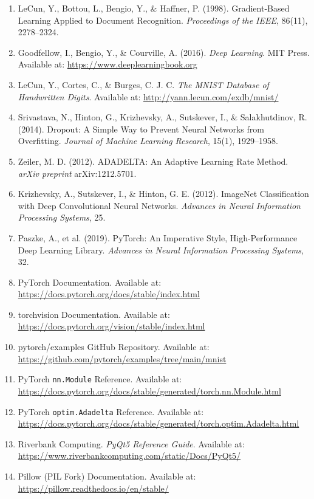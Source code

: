 \documentclass[12pt,a4paper,openany]{report}
\begin{document}
\begin{enumerate}
    \item LeCun, Y., Bottou, L., Bengio, Y., \& Haffner, P. (1998). Gradient-Based Learning Applied to Document Recognition. \textit{Proceedings of the IEEE}, 86(11), 2278--2324.
    \item Goodfellow, I., Bengio, Y., \& Courville, A. (2016). \textit{Deep Learning}. MIT Press. Available at: \url{https://www.deeplearningbook.org}
    \item LeCun, Y., Cortes, C., \& Burges, C. J. C. \textit{The MNIST Database of Handwritten Digits}. Available at: \url{http://yann.lecun.com/exdb/mnist/}
    \item Srivastava, N., Hinton, G., Krizhevsky, A., Sutskever, I., \& Salakhutdinov, R. (2014). Dropout: A Simple Way to Prevent Neural Networks from Overfitting. \textit{Journal of Machine Learning Research}, 15(1), 1929--1958.
    \item Zeiler, M. D. (2012). ADADELTA: An Adaptive Learning Rate Method. \textit{arXiv preprint} arXiv:1212.5701.
    \item Krizhevsky, A., Sutskever, I., \& Hinton, G. E. (2012). ImageNet Classification with Deep Convolutional Neural Networks. \textit{Advances in Neural Information Processing Systems}, 25.
    \item Paszke, A., et al. (2019). PyTorch: An Imperative Style, High-Performance Deep Learning Library. \textit{Advances in Neural Information Processing Systems}, 32.
    \item PyTorch Documentation. Available at: \url{https://docs.pytorch.org/docs/stable/index.html}
    \item torchvision Documentation. Available at: \url{https://docs.pytorch.org/vision/stable/index.html}
    \item pytorch/examples GitHub Repository. Available at: \url{https://github.com/pytorch/examples/tree/main/mnist}
    \item PyTorch \texttt{nn.Module} Reference. Available at: \url{https://docs.pytorch.org/docs/stable/generated/torch.nn.Module.html}
    \item PyTorch \texttt{optim.Adadelta} Reference. Available at: \url{https://docs.pytorch.org/docs/stable/generated/torch.optim.Adadelta.html}
    \item Riverbank Computing. \textit{PyQt5 Reference Guide}. Available at: \url{https://www.riverbankcomputing.com/static/Docs/PyQt5/}
    \item Pillow (PIL Fork) Documentation. Available at: \url{https://pillow.readthedocs.io/en/stable/}
\end{enumerate}
\end{document}
